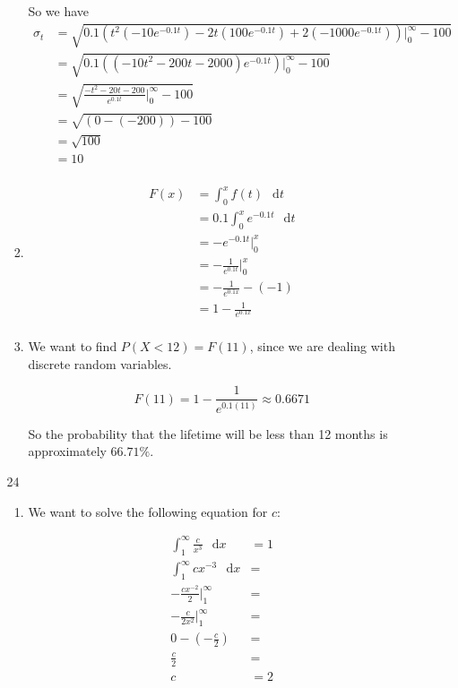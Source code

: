 \documentclass[12pt,letterpaper]{article}
\newcommand*\dif{\mathop{}\!\mathrm{d}}
\begin{document}
\begin{enumerate}
\begin{enumerate}
\begin{enumerate}[label=(\arabic*)]
              So we have
              \begin{align*}
                \sigma_t &= \sqrt{0.1 \left( t^2(-10e^{-0.1 t}) - 2t (100e^{-0.1 t}) + 2 (-1000e^{-0.1 t}) \right) \Big|_0^\infty - 100} \\
                &= \sqrt{0.1 \left( (-10t^2 - 200t - 2000) e^{-0.1 t} \right) \Big|_0^\infty - 100} \\
                &= \sqrt{\frac{-t^2 - 20t - 200}{e^{0.1 t}} \Big|_0^\infty - 100} \\
                &= \sqrt{(0 - (-200)) - 100} \\
                &= \sqrt{100} \\
                &= 10 \\
              \end{align*}
            \item
              \begin{align*}
                F(x) &= \int_0^x \! f(t) \, \dif t \\
                &= 0.1 \int_0^x \! e^{-0.1 t} \, \dif t \\
                &= - e^{-0.1 t} \Big|_0^x \\
                &= - \frac{1}{e^{0.1 t}} \Big|_0^x \\
                &= - \frac{1}{e^{0.1 x}} - (- 1) \\
                &= 1 - \frac{1}{e^{0.1 x}} \\
              \end{align*}
            \item
              We want to find $P(X < 12) = F(11)$,
              since we are dealing with discrete random variables.

              \[
                F(11) = 1 - \frac{1}{e^{0.1 (11)}} \approx 0.6671
              \]

              So the probability that the lifetime will be less than 12 months is approximately $66.71\%$.
          \end{enumerate}
        \item [24]
          \begin{enumerate}[label=(\arabic*)]
            \item

              We want to solve the following equation for $c$:

              \begin{align*}
                \int_1^\infty \! \frac{c}{x^3} \, \dif x &= 1 \\
                \int_1^\infty \! c x^{-3} \, \dif x &= \\
                -\frac{c x^{-2}}{2} \Big|_1^\infty &= \\
                -\frac{c}{2x^2} \Big|_1^\infty &= \\
                0 - (-\frac{c}{2}) &= \\
                \frac{c}{2} &= \\
                c &= 2\\
              \end{align*}


\end{enumerate}
\end{enumerate}
\end{enumerate}
\end{document}
